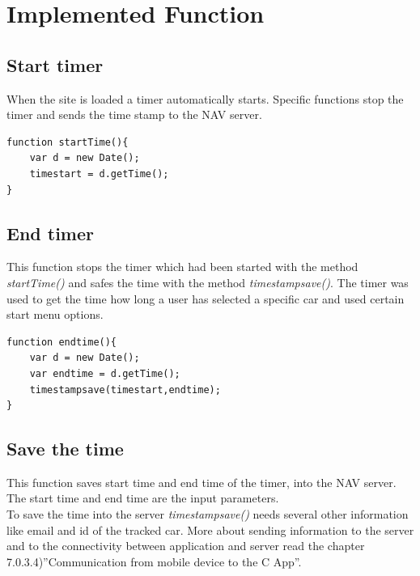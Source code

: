 \section{Implemented Function}


\subsection{Start timer}
When the site is loaded a timer automatically starts. Specific functions stop the timer and sends the time stamp to the NAV server.
\\
\begin{lstlisting}[language=html, caption= 
Start timer function,captionpos=b]
function startTime(){
	var d = new Date();
	timestart = d.getTime();
}
\end{lstlisting}

\subsection{End timer}
This function stops the timer which had been started with the method \textit{startTime()} and safes the time with the method \textit{timestampsave()}. The timer was used to get the time how long a user has selected a specific car and used certain start menu options.
\\

\begin{lstlisting}[language=html, caption= 
End timer function,captionpos=b]
function endtime(){
	var d = new Date();
	var endtime = d.getTime();
	timestampsave(timestart,endtime);
}
\end{lstlisting}


\subsection{Save the time}
This function saves start time and end time of the timer, into the NAV server. The start time and end time are the input parameters. 
\\


To save the time into the server \textit{timestampsave()} needs several other information like email and id of the tracked car. More about sending information to the server and  to the connectivity between application and server read the chapter 7.0.3.4)''Communication from mobile device to the C App''.
\\

